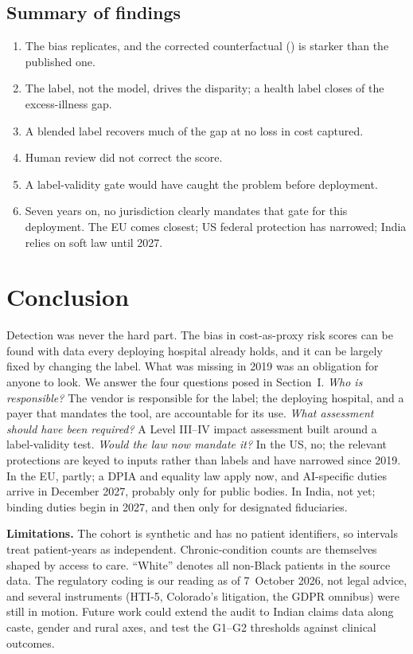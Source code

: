 \documentclass[conference]{IEEEtran}
\begin{document}
\subsection{Summary of findings}
\begin{enumerate}
\item The bias replicates, and the corrected counterfactual (\SwapFixed) is starker than the published one.
\item The label, not the model, drives the disparity; a health label closes \ExcessHealth{} of the excess-illness gap.
\item A blended label recovers much of the gap at no loss in cost captured.
\item Human review did not correct the score.
\item A label-validity gate would have caught the problem before deployment.
\item Seven years on, no jurisdiction clearly mandates that gate for this deployment. The EU comes closest; US federal protection has narrowed; India relies on soft law until 2027.
\end{enumerate}

\section{Conclusion}
Detection was never the hard part. The bias in cost-as-proxy risk scores can be found with data every deploying hospital already holds, and it can be largely fixed by changing the label. What was missing in 2019 was an obligation for anyone to look. We answer the four questions posed in Section~I. \emph{Who is responsible?} The vendor is responsible for the label; the deploying hospital, and a payer that mandates the tool, are accountable for its use. \emph{What assessment should have been required?} A Level III--IV impact assessment built around a label-validity test. \emph{Would the law now mandate it?} In the US, no; the relevant protections are keyed to inputs rather than labels and have narrowed since 2019. In the EU, partly; a DPIA and equality law apply now, and AI-specific duties arrive in December 2027, probably only for public bodies. In India, not yet; binding duties begin in 2027, and then only for designated fiduciaries.

\textbf{Limitations.} The cohort is synthetic and has no patient identifiers, so intervals treat patient-years as independent. Chronic-condition counts are themselves shaped by access to care. ``White'' denotes all non-Black patients in the source data. The regulatory coding is our reading as of 7~October 2026, not legal advice, and several instruments (HTI-5, Colorado's litigation, the GDPR omnibus) were still in motion. Future work could extend the audit to Indian claims data along caste, gender and rural axes, and test the G1--G2 thresholds against clinical outcomes.
\end{document}
